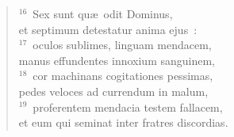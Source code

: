 \begin{flushleft}\begin{verse}${}^{16}$~Sex sunt qu\ae\ odit Dominus,\\ et septimum detestatur anima ejus~:\\
${}^{17}$~oculos sublimes, linguam mendacem,\\ manus effundentes innoxium sanguinem,\\
${}^{18}$~cor machinans cogitationes pessimas,\\ pedes veloces ad currendum in malum,\\
${}^{19}$~proferentem mendacia testem fallacem,\\ et eum qui seminat inter fratres discordias.\end{verse}\end{flushleft}


